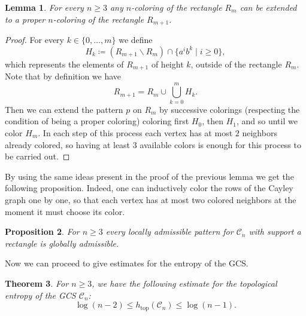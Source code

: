 \documentclass[letterpaper,10pt]{article}
\theoremstyle{plain}
\newtheorem{theorem}{Theorem}[section]
\newtheorem{lemma}[theorem]{Lemma}
\newtheorem{proposition}[theorem]{Proposition}
\def\htop{h_{\mathrm{top}}}
\begin{document}
	\begin{lemma} \label{lem.gcs_extend_to_rectangles} For every $n\ge 3$ any $n$-coloring of the rectangle $R_m$ can be extended to a proper $n$-coloring of the rectangle $R_{m+1}$.
	\end{lemma}
	\begin{proof}
		For every $k\in \{0,\ldots,m\}$ we define $$H_k\coloneqq \left(R_{m+1}\backslash R_{m}\right)\cap \{a^ib^k\mid i\ge 0\},$$
		which represents the elements of $R_{m+1}$ of height $k$, outside of the rectangle $R_m$. Note that by definition we have $$R_{m+1}=R_m\cup \bigcup_{k=0}^{m}H_k.$$ Then we can extend the pattern $p$ on $R_m$ by successive colorings (respecting the condition of being a proper coloring) coloring first $H_0$, then $H_1$, and so until we color $H_m$. In each step of this process each vertex has at most $2$ neighbors already colored, so having at least $3$ available colors is enough for this process to be carried out. 
	\end{proof}
	By using the same ideas present in the proof of the previous lemma we get the following proposition. Indeed, one can inductively color the rows of the Cayley graph one by one, so that each vertex has at most two colored neighbors at the moment it must choose its color. 
	\begin{proposition}\label{prop.gcs_rectangle_extension} For $n\ge 3$ every locally admissible pattern for $\mathcal{C}_n$ with support a rectangle is globally admissible.
	\end{proposition}
Now we can proceed to give estimates for the entropy of the GCS.
\begin{theorem} For $n\ge 3$, we have the following estimate for the topological entropy of the GCS $\mathcal{C}_n$:
	$$
	\log(n-2)\le \htop(\mathcal{C}_n)\le \log(n-1).
	$$
\end{theorem}
\end{document}
